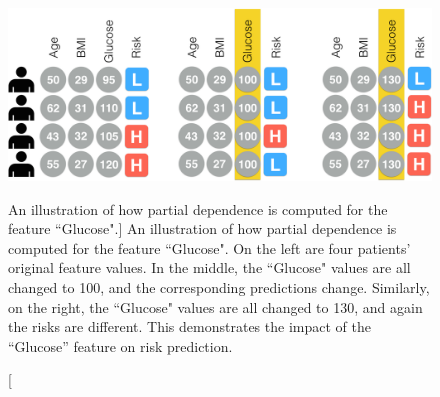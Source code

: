 
\begin{figure}
\centering
\includegraphics[width=0.90\linewidth]{prospector/partial-dependence-explanation} %
\caption[An illustration of how partial dependence is computed for the feature ``Glucose".]{
An illustration of how partial dependence is computed for the feature ``Glucose".  On the left are four patients' original feature values.  In the middle, the ``Glucose" values are all changed to 100, and the corresponding predictions change.  Similarly, on the right, the ``Glucose" values are all changed to 130, and again the risks are different.  This demonstrates the impact of the ``Glucose'' feature on risk prediction.
}
\label{figs:pdexplain}
\end{figure}